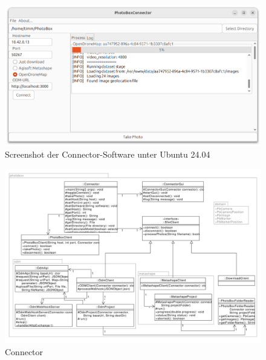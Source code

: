 \documentclass[./00PhotoBox.tex]{subfiles}
\begin{document}
\begin{figure}
  \centering
  \includegraphics[width=1\textwidth]{./img/connector_screenshot.png}
  \caption{Screenshot der Connector-Software unter Ubuntu 24.04} %
  \label{img:screenshot_connector} %
\end{figure}

\begin{figure}
  \centering
  \includegraphics[width=1\textwidth]{./img/uml/uml_connector_classdiagramm.pdf}
  \caption{Connector} %
  \label{img:uml_connector} %
\end{figure}

\biblio
\end{document}
